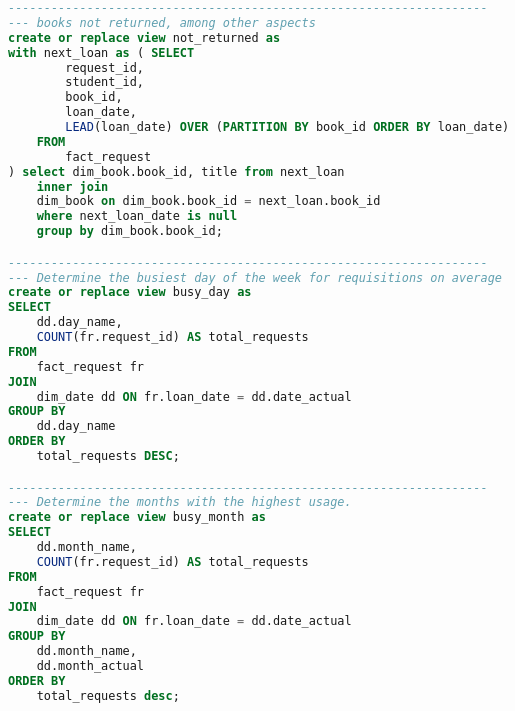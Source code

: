 \begin{lstlisting}[language=SQL, caption={init.sql}, label={lst:init_sql}]
-------------------------------------------------------------------
--- books not returned, among other aspects
create or replace view not_returned as
with next_loan as ( SELECT 
        request_id,
        student_id,
        book_id,
        loan_date,
        LEAD(loan_date) OVER (PARTITION BY book_id ORDER BY loan_date) AS next_loan_date
    FROM 
        fact_request
) select dim_book.book_id, title from next_loan
	inner join
	dim_book on dim_book.book_id = next_loan.book_id
	where next_loan_date is null
	group by dim_book.book_id;

-------------------------------------------------------------------
--- Determine the busiest day of the week for requisitions on average
create or replace view busy_day as
SELECT
    dd.day_name,
    COUNT(fr.request_id) AS total_requests
FROM
    fact_request fr
JOIN
    dim_date dd ON fr.loan_date = dd.date_actual
GROUP BY
    dd.day_name
ORDER BY
    total_requests DESC;

-------------------------------------------------------------------
--- Determine the months with the highest usage.
create or replace view busy_month as
SELECT
    dd.month_name,
    COUNT(fr.request_id) AS total_requests
FROM
    fact_request fr
JOIN
    dim_date dd ON fr.loan_date = dd.date_actual
GROUP BY
    dd.month_name, 
    dd.month_actual
ORDER BY
    total_requests desc;

\end{lstlisting}
